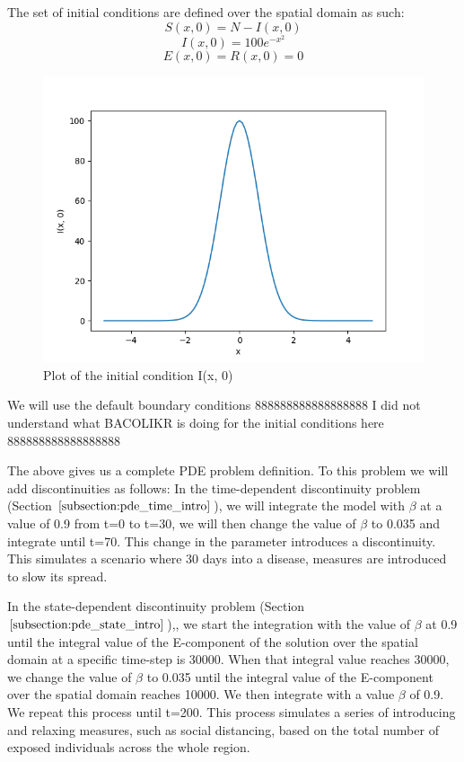 \documentclass{article}
\begin{document}
The set of initial conditions are defined over the spatial domain as such:
\begin{equation}
S(x, 0) = N - I(x, 0)
\end{equation}
\begin{equation}
I(x, 0) = 100e^{-x^2}
\end{equation}
\begin{equation}
E(x, 0) = R(x, 0) = 0
\end{equation}

\begin{figure}[H]
\centering
\includegraphics[width=0.7\linewidth]{./figures/pde_I_0}
\caption{Plot of the initial condition I(x, 0)}
\label{fig:pde_I_0}
\end{figure}

We will use the default boundary conditions 888888888888888888 I did not understand what BACOLIKR is doing for the initial conditions here 888888888888888888

The above gives us a complete PDE problem definition. To this problem we will add discontinuities as follows: 
In the time-dependent discontinuity problem (Section $\ref{subsection:pde_time_intro}$), we will integrate the model with $\beta$ at a value of 0.9 from t=0 to t=30, we will then change the value of $\beta$ to 0.035 and integrate until t=70. This change in the parameter introduces a discontinuity. This simulates a scenario where 30 days into a disease, measures are introduced to slow its spread.

In the state-dependent discontinuity problem (Section $\ref{subsection:pde_state_intro}$),, we start the integration with the value of $\beta$ at 0.9 until the integral value of the E-component of the solution over the spatial domain at a specific time-step is 30000. When that integral value reaches 30000, we change the value of $\beta$ to 0.035 until the integral value of the E-component over the spatial domain reaches 10000. We then integrate with a value $\beta$ of 0.9. We repeat this process until t=200. This process simulates a series of introducing and relaxing measures, such as social distancing, based on the total number of exposed individuals across the whole region.
\end{document}
